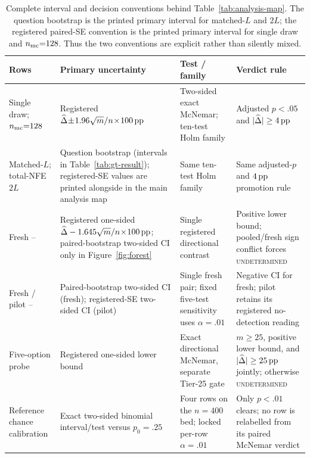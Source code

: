 \begin{table}[H]
\centering
\footnotesize
\setlength{\tabcolsep}{3pt}
\caption{Complete interval and decision conventions behind
Table~\ref{tab:analysis-map}.  The question bootstrap is the printed primary
interval for matched-$L$ and $2L$; the registered paired-SE convention is the
printed primary interval for single draw and $n_{\rm mc}{=}128$.  Thus the two
conventions are explicit rather than silently mixed.}
\label{tab:analysis-map-detail}
\begin{tabularx}{\textwidth}{@{}P{0.19\textwidth}P{0.28\textwidth}YY@{}}
\toprule
Rows & Primary uncertainty & Test / family & Verdict rule \\
\midrule
Single draw; $n_{\rm mc}{=}128$ & Registered
$\widehat\Delta\!\pm\!1.96\sqrt{m}/n\!\times\!100\,\mathrm{pp}$ & Two-sided exact
McNemar; ten-test Holm family & Adjusted $p<.05$ and $|\widehat\Delta|\ge4\,\mathrm{pp}$ \\
Matched-$L$; total-NFE $2L$ & Question bootstrap (intervals in
Table~\ref{tab:gt-result}); registered-SE values are printed alongside in the
main analysis map & Same ten-test Holm family & Same adjusted-$p$ and $4\,\mathrm{pp}$
promotion rule \\
Fresh \sconf{}--\rinj{} & Registered one-sided
$\widehat\Delta-1.645\sqrt{m}/n\!\times\!100\,\mathrm{pp}$; paired-bootstrap two-sided
CI only in Figure~\ref{fig:forest} & Single registered directional contrast &
Positive lower bound; pooled/fresh sign conflict forces \textsc{undetermined} \\
Fresh / pilot \sconf{}--\finj{} & Paired-bootstrap two-sided CI (fresh);
registered-SE two-sided CI (pilot) & Single fresh pair; fixed five-test
sensitivity uses $\alpha=.01$ & Negative CI for fresh; pilot retains its
registered no-detection reading \\
Five-option probe & Registered one-sided lower bound & Exact directional
McNemar, separate Tier-25 gate & $m\ge25$, positive lower bound, and
$|\widehat\Delta|\ge25\,\mathrm{pp}$ jointly; otherwise \textsc{undetermined} \\
Reference chance calibration & Exact two-sided binomial interval/test versus
$p_0=.25$ & Four rows on the $n=400$ bed; locked per-row $\alpha=.01$ & Only
$p<.01$ clears; no row is relabelled from its paired McNemar verdict \\
\bottomrule
\end{tabularx}
\end{table}

